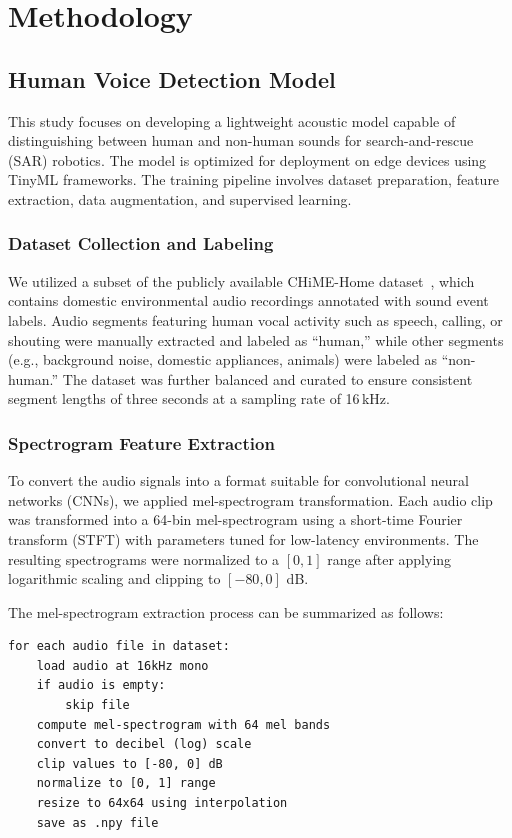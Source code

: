 \section{Methodology}

\subsection{Human Voice Detection Model}
This study focuses on developing a lightweight acoustic model capable of distinguishing between human and non-human sounds for search-and-rescue (SAR) robotics. The model is optimized for deployment on edge devices using TinyML frameworks. The training pipeline involves dataset preparation, feature extraction, data augmentation, and supervised learning.

\subsubsection{Dataset Collection and Labeling}
We utilized a subset of the publicly available CHiME-Home dataset~\cite{Foster2015chime}, which contains domestic environmental audio recordings annotated with sound event labels. Audio segments featuring human vocal activity such as speech, calling, or shouting were manually extracted and labeled as “human,” while other segments (e.g., background noise, domestic appliances, animals) were labeled as “non-human.” The dataset was further balanced and curated to ensure consistent segment lengths of three seconds at a sampling rate of 16\,kHz.

\subsubsection{Spectrogram Feature Extraction}
To convert the audio signals into a format suitable for convolutional neural networks (CNNs), we applied mel-spectrogram transformation. Each audio clip was transformed into a 64-bin mel-spectrogram using a short-time Fourier transform (STFT) with parameters tuned for low-latency environments. The resulting spectrograms were normalized to a \([0, 1]\) range after applying logarithmic scaling and clipping to \([-80, 0]\) dB.

The mel-spectrogram extraction process can be summarized as follows:

\begin{verbatim}
for each audio file in dataset:
    load audio at 16kHz mono
    if audio is empty:
        skip file
    compute mel-spectrogram with 64 mel bands
    convert to decibel (log) scale
    clip values to [-80, 0] dB
    normalize to [0, 1] range
    resize to 64x64 using interpolation
    save as .npy file
\end{verbatim}

